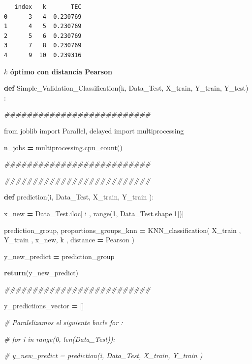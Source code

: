 \documentclass[
  11pt,
  a4paper,
]{article}
\newenvironment{Shaded}{\begin{snugshade}}{\end{snugshade}}
\newcommand{\BuiltInTok}[1]{#1}
\newcommand{\CommentTok}[1]{\textcolor[rgb]{0.56,0.35,0.01}{\textit{#1}}}
\newcommand{\ControlFlowTok}[1]{\textcolor[rgb]{0.13,0.29,0.53}{\textbf{#1}}}
\newcommand{\DecValTok}[1]{\textcolor[rgb]{0.00,0.00,0.81}{#1}}
\newcommand{\ImportTok}[1]{#1}
\newcommand{\KeywordTok}[1]{\textcolor[rgb]{0.13,0.29,0.53}{\textbf{#1}}}
\newcommand{\NormalTok}[1]{#1}
\newcommand{\OperatorTok}[1]{\textcolor[rgb]{0.81,0.36,0.00}{\textbf{#1}}}
\newcommand{\StringTok}[1]{\textcolor[rgb]{0.31,0.60,0.02}{#1}}
\begin{document}
\begin{verbatim}
   index   k       TEC
0      3   4  0.230769
1      4   5  0.230769
2      5   6  0.230769
3      7   8  0.230769
4      9  10  0.239316
\end{verbatim}

\newpage

\textbf{\(k\) óptimo con distancia Pearson}

\begin{Shaded}
\begin{Highlighting}[]
\KeywordTok{def}\NormalTok{ Simple\_Validation\_Classification(k, Data\_Test, X\_train, Y\_train, Y\_test) :}

    \CommentTok{\#\#\#\#\#\#\#\#\#\#\#\#\#\#\#\#\#\#\#\#\#\#\#\#\#\#}

    \ImportTok{from}\NormalTok{ joblib }\ImportTok{import}\NormalTok{ Parallel, delayed}
    \ImportTok{import}\NormalTok{ multiprocessing}

\NormalTok{    n\_jobs  }\OperatorTok{=}\NormalTok{ multiprocessing.cpu\_count()}

    \CommentTok{\#\#\#\#\#\#\#\#\#\#\#\#\#\#\#\#\#\#\#\#\#\#\#\#\#\#}

    \CommentTok{\#\#\#\#\#\#\#\#\#\#\#\#\#\#\#\#\#\#\#\#\#\#\#\#\#\#}

    \KeywordTok{def}\NormalTok{ prediction(i, Data\_Test, X\_train, Y\_train ):}

\NormalTok{     x\_new }\OperatorTok{=}\NormalTok{ Data\_Test.iloc[ i , }\BuiltInTok{range}\NormalTok{(}\DecValTok{1}\NormalTok{, Data\_Test.shape[}\DecValTok{1}\NormalTok{])]}

\NormalTok{     prediction\_group, proportions\_groups\_knn  }\OperatorTok{=}\NormalTok{  KNN\_classification( X\_train , Y\_train , x\_new, k , distance }\OperatorTok{=} \StringTok{\textquotesingle{}Pearson\textquotesingle{}}\NormalTok{ )}
     
\NormalTok{     y\_new\_predict }\OperatorTok{=}\NormalTok{ prediction\_group}

     \ControlFlowTok{return}\NormalTok{(y\_new\_predict)}

    \CommentTok{\#\#\#\#\#\#\#\#\#\#\#\#\#\#\#\#\#\#\#\#\#\#\#\#\#\#}

\NormalTok{    y\_predictions\_vector }\OperatorTok{=}\NormalTok{ []}

    \CommentTok{\# Paralelizamos el siguiente bucle for :}

    \CommentTok{\# for i in  range(0, len(Data\_Test)):}

        \CommentTok{\# y\_new\_predict = prediction(i, Data\_Test, X\_train, Y\_train )}


\end{Highlighting}
\end{Shaded}
\end{document}

